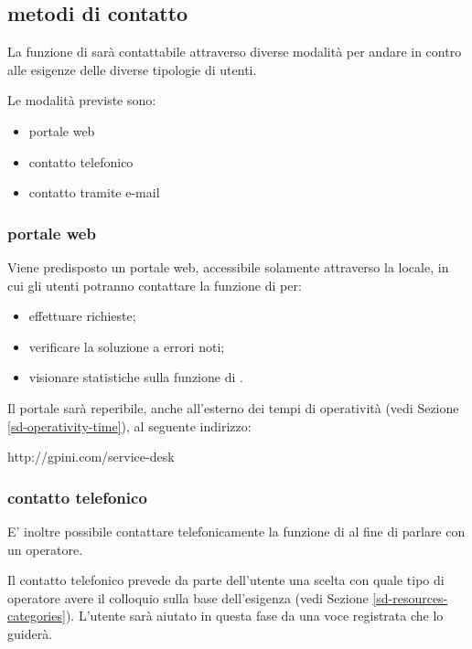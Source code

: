 \subsection[Metodi di contatto]{metodi di contatto}
\label{sd-contact-mode}
La funzione di  sarà contattabile attraverso diverse modalità per andare in contro alle esigenze delle diverse tipologie di utenti.

Le modalità previste sono:

\begin{itemize}
\item{portale web}
\item{contatto telefonico}
\item{contatto tramite e-mail}
\end{itemize}

\subsubsection[Portale Web]{portale web}
Viene predisposto un portale web, accessibile solamente attraverso la  locale, in cui gli utenti potranno contattare la funzione di  per:

\begin{itemize}
\item{effettuare richieste;}
\item{verificare la soluzione a errori noti;}
\item{visionare statistiche sulla funzione di .}
\end{itemize}

Il portale sarà reperibile, anche all'esterno dei tempi di operatività (vedi Sezione \ref{sd-operativity-time}), al seguente indirizzo: 

\begin{center}
http://gpini.com/service-desk
\end{center}

\subsubsection[Contatto telefonico]{contatto telefonico}
E' inoltre possibile contattare telefonicamente la funzione di  al fine di parlare con un operatore. 

Il contatto telefonico prevede da parte dell'utente una scelta con quale tipo di operatore avere il colloquio sulla base dell'esigenza (vedi Sezione \ref{sd-resources-categories}). L'utente sarà aiutato in questa fase da una voce registrata che lo guiderà.

